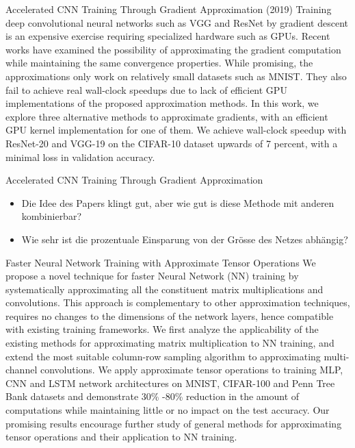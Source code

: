 \documentclass[10pt]{beamer}
\begin{document}
\begin{frame}{Accelerated CNN Training Through Gradient Approximation (2019) }
 Training deep convolutional neural networks such as VGG and ResNet by gradient descent is an expensive exercise requiring specialized hardware such as GPUs. Recent works have examined the possibility of approximating the gradient computation while maintaining the same convergence properties. While promising, the approximations only work on relatively small datasets such as MNIST. They also fail to achieve real wall-clock speedups due to lack of efficient GPU implementations of the proposed approximation methods. In this work, we explore three alternative methods to approximate gradients, with an efficient GPU kernel implementation for one of them. We achieve wall-clock speedup with ResNet-20 and VGG-19 on the CIFAR-10 dataset upwards of 7 percent, with a minimal loss in validation accuracy.
\end{frame}

\begin{frame}{Accelerated CNN Training Through Gradient Approximation}
\begin{itemize}
 \item Die Idee des Papers klingt gut, aber wie gut is diese Methode mit anderen kombinierbar?
 \item Wie sehr ist die prozentuale Einsparung von der Grösse des Netzes abhängig?
\end{itemize}
\end{frame}


\begin{frame}{Faster Neural Network Training with Approximate Tensor Operations }
 We propose a novel technique for faster Neural Network (NN) training by systematically approximating all the constituent matrix multiplications and convolutions. This approach is complementary to other approximation techniques, requires no changes to the dimensions of the network layers, hence compatible with existing training frameworks. We first analyze the applicability of the existing methods for approximating matrix multiplication to NN training, and extend the most suitable column-row sampling algorithm to approximating multi-channel convolutions. We apply approximate tensor operations to training MLP, CNN and LSTM network architectures on MNIST, CIFAR-100 and Penn Tree Bank datasets and demonstrate 30\% -80\% reduction in the amount of computations while maintaining little or no impact on the test accuracy. Our promising results encourage further study of general methods for approximating tensor operations and their application to NN training.
\end{frame}
\end{document}
